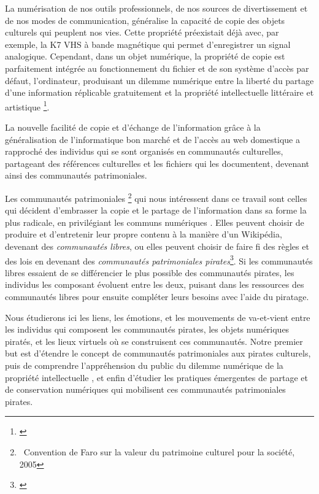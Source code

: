 La numérisation de nos outils professionnels, de nos sources de divertissement et de nos modes de communication, généralise la capacité de copie des objets culturels qui peuplent nos vies. Cette propriété préexistait déjà avec, par exemple, la K7 VHS à bande magnétique qui permet d'enregistrer un signal analogique. Cependant, dans un objet numérique, la propriété de copie est parfaitement intégrée au fonctionnement du fichier et de son système d'accès par défaut, l'ordinateur, produisant un dilemme numérique entre la liberté du partage d'une information réplicable gratuitement et la propriété intellectuelle littéraire et artistique \footnote{\cite{national_research_council_us_digital_2010}}.

La nouvelle facilité de copie et d'échange de l'information grâce à la généralisation de l'informatique bon marché et de l'accès au web domestique a rapproché des individus qui se sont organisés en communautés culturelles,  partageant des références culturelles et les fichiers qui les documentent, devenant ainsi des communautés patrimoniales.

Les communautés patrimoniales \footnote{~Convention de Faro sur la valeur du patrimoine culturel pour la société, 2005} qui nous intéressent dans ce travail sont celles qui décident d'embrasser la copie et le partage de l'information dans sa forme la plus radicale, en privilégiant les \guillemetleft communs numériques \guillemetright. Elles peuvent choisir de produire et d'entretenir leur propre contenu à la manière d'un Wikipédia, devenant des \textit{communautés libres}, ou elles peuvent choisir de faire fi des règles et des lois en devenant des \textit{communautés patrimoniales pirates}\footnote{\cite{bermes_lecran_2024}}. Si les communautés libres essaient de se différencier le plus possible des communautés pirates, les individus les composant évoluent entre les deux, puisant dans les ressources des communautés libres pour ensuite compléter leurs besoins avec l'aide du piratage.

Nous étudierons ici les liens, les émotions, et les mouvements de va-et-vient entre les individus qui composent les communautés pirates, les objets numériques piratés, et les lieux virtuels où se construisent ces communautés. Notre premier but est d'étendre le concept de communautés patrimoniales aux pirates culturels, puis de comprendre l’appréhension du public du \guillemetleft dilemme numérique de la propriété intellectuelle \guillemetright, et enfin d'étudier les pratiques émergentes de partage et de conservation numériques qui mobilisent ces communautés patrimoniales pirates.

